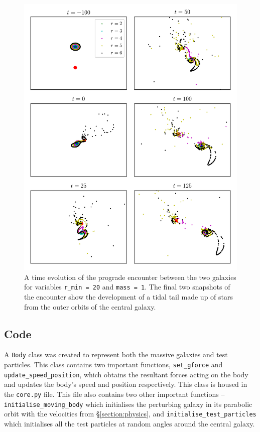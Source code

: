 \documentclass[twoside,twocolumn]{article}
\begin{document}
\begin{figure}
    \centering
    \includegraphics[width=\linewidth]{images/anticlockwise_positions.png}
    \caption{A time evolution of the prograde encounter between the two galaxies for variables \texttt{r\_min = 20} and \texttt{mass = 1}. The final two snapshots of the encounter show the development of a tidal tail made up of stars from the outer orbits of the central galaxy.}
    \label{figure:prograde}
\end{figure} 
        
    \subsection{Code}
        A \texttt{Body} class was created to represent both the massive galaxies and test particles. This class contains two important functions, \texttt{set\_gforce} and \texttt{update\_speed\_position}, which obtains the resultant forces acting on the body and updates the body's speed and position respectively. This class is housed in the \texttt{core.py} file. This file also contains two other important functions -- \texttt{initialise\_moving\_body} which initialises the perturbing galaxy in its parabolic orbit with the velocities from \S \ref{section:physics}, and \texttt{initialise\_test\_particles} which initialises all the test particles at random angles around the central galaxy.
        
\end{document}
